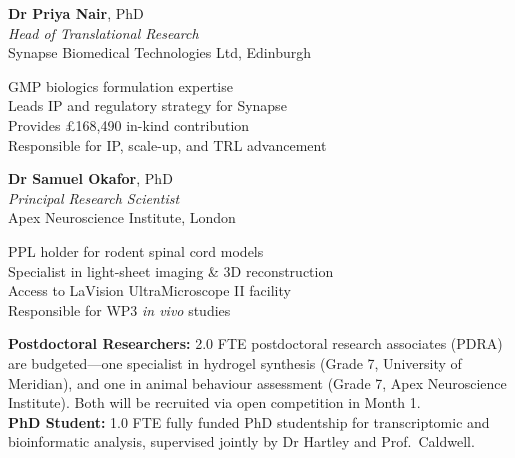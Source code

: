 \documentclass[11pt,a4paper]{article}
\newcommand{\bluebullet}{\textcolor{ukricyan}{\textbullet}\enspace}
\begin{document}
\begin{minipage}[t]{0.48\textwidth}
\begin{tcolorbox}[sectionbox, title=Industry Co-Investigator]
\textbf{Dr Priya Nair}, PhD\\
\textit{Head of Translational Research}\\
Synapse Biomedical Technologies Ltd, Edinburgh

\vspace{4pt}
\bluebullet GMP biologics formulation expertise\\
\bluebullet Leads IP and regulatory strategy for Synapse\\
\bluebullet Provides \pounds 168,490 in-kind contribution\\
\bluebullet Responsible for IP, scale-up, and TRL advancement
\end{tcolorbox}
\end{minipage}%
\hfill
\begin{minipage}[t]{0.48\textwidth}
\begin{tcolorbox}[sectionbox, title=External Collaborator]
\textbf{Dr Samuel Okafor}, PhD\\
\textit{Principal Research Scientist}\\
Apex Neuroscience Institute, London

\vspace{4pt}
\bluebullet PPL holder for rodent spinal cord models\\
\bluebullet Specialist in light-sheet imaging \& 3D reconstruction\\
\bluebullet Access to LaVision UltraMicroscope II facility\\
\bluebullet Responsible for WP3 \emph{in vivo} studies
\end{tcolorbox}
\end{minipage}

\par
\vspace{6pt}

\begin{minipage}[t]{\textwidth}
\begin{tcolorbox}[highlightbox]
\textbf{Postdoctoral Researchers:}
2.0 FTE postdoctoral research associates (PDRA) are budgeted---one specialist in
hydrogel synthesis (Grade 7, University of Meridian), and one in animal behaviour
assessment (Grade 7, Apex Neuroscience Institute). Both will be recruited via open
competition in Month 1.\\[4pt]
\textbf{PhD Student:} 1.0 FTE fully funded PhD studentship for transcriptomic and
bioinformatic analysis, supervised jointly by Dr Hartley and Prof.\ Caldwell.
\end{tcolorbox}
\end{minipage}
\end{document}
